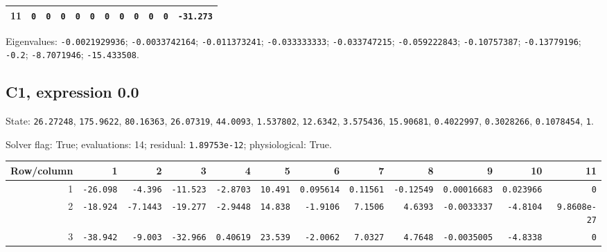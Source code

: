 \begin{landscape}
\begin{tabular}{rrrrrrrrrrrr}
11 & \texttt{0} & \texttt{0} & \texttt{0} & \texttt{0} & \texttt{0} & \texttt{0} & \texttt{0} & \texttt{0} & \texttt{0} & \texttt{0} & \texttt{-31.273} \\

\bottomrule\end{tabular}\par\endgroup

{\scriptsize Eigenvalues: \texttt{-0.0021929936}; \texttt{-0.0033742164}; \texttt{-0.011373241}; \texttt{-0.033333333}; \texttt{-0.033747215}; \texttt{-0.059222843}; \texttt{-0.10757387}; \texttt{-0.13779196}; \texttt{-0.2}; \texttt{-8.7071946}; \texttt{-15.433508}.\par}

\clearpage
\subsection*{C1, expression 0.0}
{\scriptsize State: \texttt{26.27248}, \texttt{175.9622}, \texttt{80.16363}, \texttt{26.07319}, \texttt{44.0093}, \texttt{1.537802}, \texttt{12.6342}, \texttt{3.575436}, \texttt{15.90681}, \texttt{0.4022997}, \texttt{0.3028266}, \texttt{0.1078454}, \texttt{1}.\par

Solver flag: True; evaluations: 14; residual: \texttt{1.89753e-12}; physiological: True.\par}

\begingroup\scriptsize\setlength{\tabcolsep}{3pt}\centering
\begin{tabular}{rrrrrrrrrrrr}\toprule

Row/column & 1 & 2 & 3 & 4 & 5 & 6 & 7 & 8 & 9 & 10 & 11 \\ \midrule

1 & \texttt{-26.098} & \texttt{-4.396} & \texttt{-11.523} & \texttt{-2.8703} & \texttt{10.491} & \texttt{0.095614} & \texttt{0.11561} & \texttt{-0.12549} & \texttt{0.00016683} & \texttt{0.023966} & \texttt{0} \\

2 & \texttt{-18.924} & \texttt{-7.1443} & \texttt{-19.277} & \texttt{-2.9448} & \texttt{14.838} & \texttt{-1.9106} & \texttt{7.1506} & \texttt{4.6393} & \texttt{-0.0033337} & \texttt{-4.8104} & \texttt{9.8608e-27} \\

3 & \texttt{-38.942} & \texttt{-9.003} & \texttt{-32.966} & \texttt{0.40619} & \texttt{23.539} & \texttt{-2.0062} & \texttt{7.0327} & \texttt{4.7648} & \texttt{-0.0035005} & \texttt{-4.8338} & \texttt{0} \\


\end{tabular}
\end{landscape}
